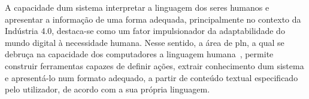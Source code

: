 A capacidade dum sistema interpretar a linguagem dos seres humanos e apresentar a informação de uma forma adequada, principalmente no contexto da Indústria 4.0, destaca-se como um fator impulsionador da adaptabilidade do mundo digital à necessidade humana. Nesse sentido, a área de \gls{pln}, a qual se debruça na capacidade dos computadores  a linguagem humana~\parencite[p.1]{applied_natural_language_processing_with_python}, permite construir ferramentas capazes de definir ações, extrair conhecimento dum sistema e apresentá-lo num formato adequado, a partir de conteúdo textual especificado pelo utilizador, de acordo com a sua própria linguagem. 












